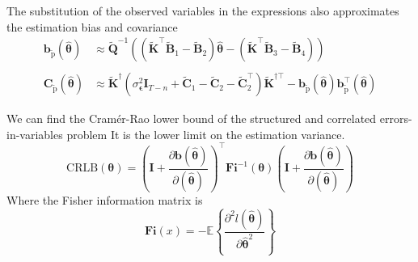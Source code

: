 \documentclass[presentation]{beamer}
\begin{document}
\begin{frame}[label={slide:statistical6}]{The substitution of the observed variables in the expressions also approximates the estimation bias and covariance}
\begin{equation*} \begin{aligned} \mathbf{b}_{\widetilde{\mathrm{p}}} \left( \widehat{\bm{\theta}} \right) & \approx \widetilde{\mathbf{Q}}^{-1} \left( \left( \widetilde{\mathbf{K}}^\top \widetilde{\mathbf{B}}_1 - \widetilde{\mathbf{B}}_2 \right) \widehat{\bm{\theta}} - \left( \widetilde{\mathbf{K}}^\top \widetilde{\mathbf{B}}_3 - \widetilde{\mathbf{B}}_4 \right) \right) \\ \\
\mathbf{C}_{\widetilde{\mathrm{p}}} \left( \widehat{\bm{\theta}} \right) & \approx \widetilde{\mathbf{K}}^\dagger \left( \sigma_{\bm{\epsilon}}^2 \mathbf{I}_{T-n} + \widetilde{\mathbf{C}}_1 - \widetilde{\mathbf{C}}_2 - \widetilde{\mathbf{C}}_2^\top \right) \widetilde{\mathbf{K}}^{\dagger \top} - \mathbf{b}_{\widetilde{\mathrm{p}}} \left( \widehat{\bm{\theta}} \right) \mathbf{b}_{\widetilde{\mathrm{p}}}^\top \left( \widehat{\bm{\theta}} \right) \end{aligned} \end{equation*}
\end{frame}

\begin{frame}[label={slide:statistical7}]{We can find the Cram\'er-Rao lower bound of the structured and correlated errors-in-variables problem}
It is the lower limit on the estimation variance.
\begin{equation*} \text{CRLB}(\bm{\theta}) = \left( \mathbf{I} + \frac{\partial \mathbf{b} (\widehat{\bm{\theta}}) }{\partial (\widehat{\bm{\theta}})} \right)^\top \mathbf{Fi}^{-1}(\bm{\theta}) \left( \mathbf{I} + \frac{\partial \mathbf{b} (\widehat{\bm{\theta}}) }{\partial (\widehat{\bm{\theta}})} \right) \end{equation*}
Where the Fisher information matrix is  
\begin{equation*} \mathbf{Fi}(x) = - \mathbb{E} \left\{ \frac{\partial ^2 l (\widehat{\bm{\theta}}) }{\partial \widehat{\bm{\theta}}^2 } \right\} \end{equation*}
\end{frame}
\end{document}
